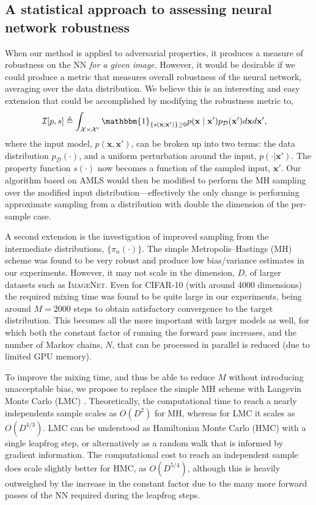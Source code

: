\subsection{A statistical approach to assessing neural network robustness}
When our method is applied to adversarial properties, it produces a measure of robustness on the NN \emph{for a given image}. However, it would be desirable if we could produce a metric that measures overall robustness of the neural network, averaging over the data distribution. We believe this is an interesting and easy extension that could be accomplished by modifying the robustness metric to,
\begin{align*}
	\mathcal{I}[p,s] &\triangleq \int_{\mathcal{X}\times\mathcal{X}'}\mathbbm{1}_{\{s(\mathbf{x};\mathbf{x}')\}\ge0}p(\mathbf{x}\mid\mathbf{x}')p_\mathcal{D}(\mathbf{x}')d\mathbf{x}d\mathbf{x}',
\end{align*}
where the input model, $p(\mathbf{x},\mathbf{x}')$, can be broken up into two terms: the data distribution $p_\mathcal{D}(\cdot)$, and a uniform perturbation around the input, $p(\cdot|\mathbf{x}')$. The property function $s(\cdot)$ now becomes a function of the sampled input, $\mathbf{x}'$. Our algorithm based on AMLS would then be modified to perform the MH sampling over the modified input distribution---effectively the only change is performing approximate sampling from a distribution with double the dimension of the per-sample case.

A second extension is the investigation of improved sampling from the intermediate distributions, $\{\pi_n(\cdot)\}$. The simple Metropolis--Hastings (MH) scheme was found to be very robust and produce low bias/variance estimates in our experiments. However, it may not scale in the dimension, $D$, of larger datasets such as {\scshape ImageNet}. Even for {\scshape CIFAR}-10 (with around 4000 dimensions) the required mixing time was found to be quite large in our experiments, being around $M=2000$ steps to obtain satisfactory convergence to the target distribution. This becomes all the more important with larger models as well, for which both the constant factor of running the forward pass increases, and the number of Markov chains, $N$, that can be processed in parallel is reduced (due to limited GPU memory).

To improve the mixing time, and thus be able to reduce $M$ without introducing unacceptable bias, we propose to replace the simple MH scheme with Langevin Monte Carlo (LMC) \citep{Neal2011}. Theoretically, the computational time to reach a nearly independents sample scales as $O(D^2)$ for MH, whereas for LMC it scales as $O(D^{4/3})$. LMC can be understood as Hamiltonian Monte Carlo (HMC) with a single leapfrog step, or alternatively as a random walk that is informed by gradient information. The computational cost to reach an independent sample does scale slightly better for HMC, as $O(D^{5/4})$, although this is heavily outweighed by the increase in the constant factor due to the many more forward passes of the NN required during the leapfrog steps.

